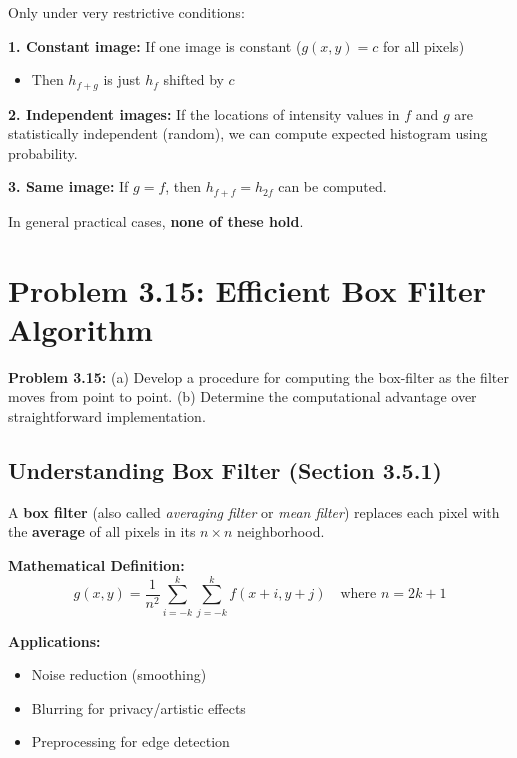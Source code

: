 \documentclass[12pt,a4paper]{article}
\begin{document}
\begin{conceptbox}
Only under very restrictive conditions:

\textbf{1. Constant image:} If one image is constant ($g(x,y) = c$ for all pixels)
\begin{itemize}
    \item Then $h_{f+g}$ is just $h_f$ shifted by $c$
\end{itemize}

\textbf{2. Independent images:} If the locations of intensity values in $f$ and $g$ are statistically independent (random), we can compute expected histogram using probability.

\textbf{3. Same image:} If $g = f$, then $h_{f+f} = h_{2f}$ can be computed.

In general practical cases, \textbf{none of these hold}.
\end{conceptbox}

\newpage
\section{Problem 3.15: Efficient Box Filter Algorithm}

\begin{questionbox}
\textbf{Problem 3.15:} (a) Develop a procedure for computing the box-filter as the filter moves from point to point. (b) Determine the computational advantage over straightforward implementation.
\end{questionbox}

\subsection{Understanding Box Filter (Section 3.5.1)}

\begin{conceptbox}
A \textbf{box filter} (also called \textit{averaging filter} or \textit{mean filter}) replaces each pixel with the \textbf{average} of all pixels in its $n \times n$ neighborhood.

\textbf{Mathematical Definition:}
\[
g(x,y) = \frac{1}{n^2} \sum_{i=-k}^{k} \sum_{j=-k}^{k} f(x+i, y+j) \quad \text{where } n = 2k+1
\]

\textbf{Applications:}
\begin{itemize}
    \item Noise reduction (smoothing)
    \item Blurring for privacy/artistic effects
    \item Preprocessing for edge detection
\end{itemize}
\end{conceptbox}
\end{document}
